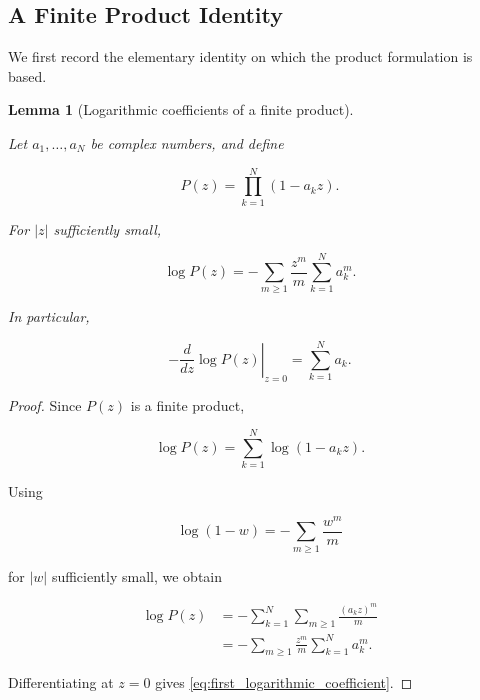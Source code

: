 \documentclass[11pt]{amsart}
\numberwithin{equation}{section}
\theoremstyle{plain}
\newtheorem{lemma}[theorem]{Lemma}
\theoremstyle{definition}
\theoremstyle{remark}
\begin{document}
\subsection{A Finite Product Identity}
\label{subsec:finite_product_identity}

We first record the elementary identity on which the product
formulation is based.

\begin{lemma}[Logarithmic coefficients of a finite product]
\label{lem:finite_product_logarithmic_coefficients}

Let \(a_1,\ldots,a_N\) be complex numbers, and define

\begin{equation}
P(z)
=
\prod_{k=1}^{N}
(1-a_k z).
\label{eq:finite_product_definition}
\end{equation}

For \(|z|\) sufficiently small,

\begin{equation}
\log P(z)
=
-
\sum_{m\ge 1}
\frac{z^m}{m}
\sum_{k=1}^{N}
a_k^m.
\label{eq:finite_product_logarithmic_expansion}
\end{equation}

In particular,

\begin{equation}
-
\left.
\frac{d}{dz}
\log P(z)
\right|_{z=0}
=
\sum_{k=1}^{N}
a_k.
\label{eq:first_logarithmic_coefficient}
\end{equation}

\end{lemma}

\begin{proof}

Since \(P(z)\) is a finite product,

\begin{equation}
\log P(z)
=
\sum_{k=1}^{N}
\log(1-a_k z).
\label{eq:finite_product_logarithm_sum}
\end{equation}

Using

\begin{equation}
\log(1-w)
=
-
\sum_{m\ge 1}
\frac{w^m}{m}
\label{eq:log_one_minus_w_expansion}
\end{equation}

for \(|w|\) sufficiently small, we obtain

\begin{align}
\log P(z)
&=
-
\sum_{k=1}^{N}
\sum_{m\ge 1}
\frac{(a_k z)^m}{m}
\label{eq:finite_product_expansion_first}
\\
&=
-
\sum_{m\ge 1}
\frac{z^m}{m}
\sum_{k=1}^{N}
a_k^m.
\label{eq:finite_product_expansion_second}
\end{align}

Differentiating at \(z=0\) gives
\eqref{eq:first_logarithmic_coefficient}.

\end{proof}
\end{document}
